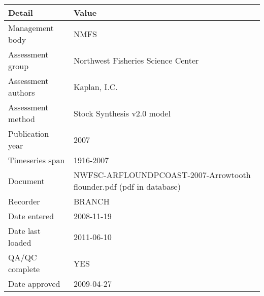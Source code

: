 \begin{table}[htb]
\centering
\begin{tabular}{lp{7cm}}
\toprule
Detail & Value \\
\midrule
Management body    & NMFS                                                                \\
Assessment group   & Northwest Fisheries Science Center                                  \\
Assessment authors & Kaplan, I.C.                                                        \\
Assessment method  & Stock Synthesis v2.0 model                                          \\
Publication year   & 2007                                                                \\
Timeseries span    & 1916-2007                                                           \\
Document           & NWFSC-ARFLOUNDPCOAST-2007-Arrowtooth flounder.pdf (pdf in database) \\
Recorder           & BRANCH                                                              \\
Date entered       & 2008-11-19                                                          \\
Date last loaded   & 2011-06-10                                                          \\
QA/QC complete     & YES                                                                 \\
Date approved      & 2009-04-27                                                          \\
\bottomrule
\end{tabular}
\label{tab:assessdet}
\end{table}

